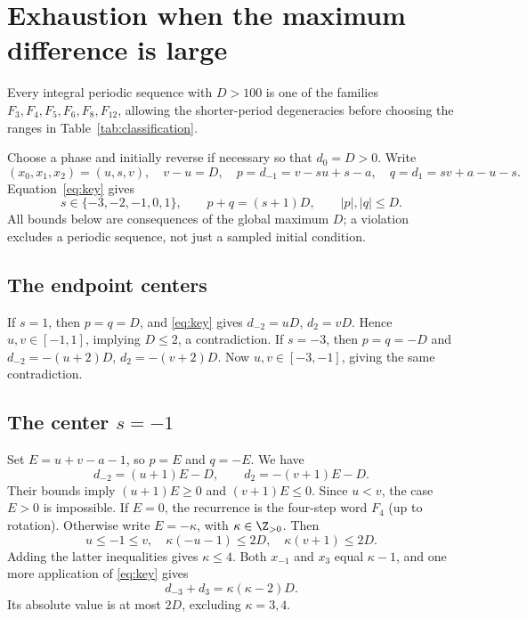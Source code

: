 \section{Exhaustion when the maximum difference is large}
\label{sec:large}

\begin{proposition}
\label{prop:large}
Every integral periodic sequence with $D>100$ is one of the
families $F_3,F_4,F_5,F_6,F_8,F_{12}$, allowing the
shorter-period degeneracies before choosing the ranges in
Table~\ref{tab:classification}.
\end{proposition}

Choose a phase and initially reverse if necessary so that
$d_0=D>0$. Write
\begin{equation}
 (x_0,x_1,x_2)=(u,s,v),\quad v-u=D,\quad
 p=d_{-1}=v-su+s-a,\quad q=d_1=sv+a-u-s.
 \label{eq:extremal}
\end{equation}
Equation~\eqref{eq:key} gives
\begin{equation}
 s\in\{-3,-2,-1,0,1\},\qquad
 p+q=(s+1)D,\qquad |p|,|q|\le D.
 \label{eq:fivecenters}
\end{equation}
All bounds below are consequences of the global maximum $D$;
a violation excludes a periodic sequence, not just a sampled
initial condition.

\subsection{The endpoint centers}
If $s=1$, then $p=q=D$, and \eqref{eq:key} gives
$d_{-2}=uD$, $d_2=vD$. Hence $u,v\in[-1,1]$, implying
$D\le2$, a contradiction. If $s=-3$, then $p=q=-D$ and
$d_{-2}=-(u+2)D$, $d_2=-(v+2)D$. Now
$u,v\in[-3,-1]$, giving the same contradiction.

\subsection{The center \texorpdfstring{$s=-1$}{s=-1}}
Set $E=u+v-a-1$, so $p=E$ and $q=-E$. We have
\[
 d_{-2}=(u+1)E-D,\qquad d_2=-(v+1)E-D.
\]
Their bounds imply $(u+1)E\ge0$ and $(v+1)E\le0$.
Since $u<v$, the case $E>0$ is impossible. If $E=0$,
the recurrence is the four-step word $F_4$ (up to rotation).
Otherwise write $E=-\kappa$, with $\kappa\in\Z_{>0}$.
Then
\[
 u\le-1\le v,\quad
 \kappa(-u-1)\le2D,\quad \kappa(v+1)\le2D.
\]
Adding the latter inequalities gives $\kappa\le4$.
Both $x_{-1}$ and $x_3$ equal $\kappa-1$, and one more
application of \eqref{eq:key} gives
\[
 d_{-3}+d_3=\kappa(\kappa-2)D.
\]
Its absolute value is at most $2D$, excluding $\kappa=3,4$.

